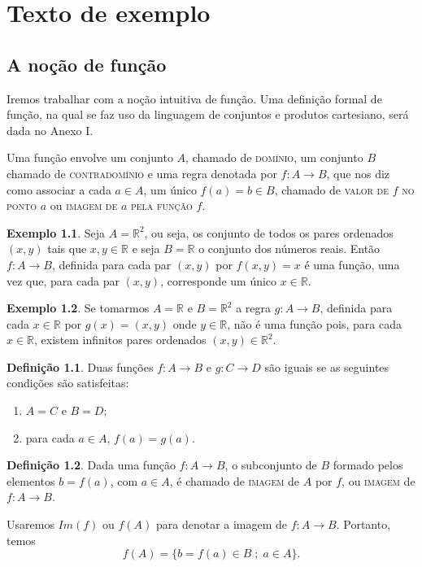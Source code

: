 \documentclass[a4paper,12pt]{monografia}
\theoremstyle{plain}
\theoremstyle{definition}
\newtheorem{definition}{Defini\c{c}\~ao}[section]
\newtheorem{example}{Exemplo}[section]
\theoremstyle{remark}
\newcommand{\R}{\mathbb{R}}
\begin{document}
\chapter{Texto de exemplo}
\section{A no\c{c}\~ao de fun\c{c}\~ao}
\indent\indent Iremos trabalhar com a no\c{c}\~ao intuitiva de fun\c{c}\~ao.
Uma defini\c{c}\~ao formal de fun\c{c}\~ao, na qual se faz uso da linguagem de
conjuntos e produtos cartesiano, ser\'a dada no Anexo I.

Uma fun\c{c}\~ao envolve um conjunto $A$, chamado de \textsc{dom\'inio},
um conjunto $B$ chamado de \textsc{contradom\'inio} e uma regra
denotada por $f:A \rightarrow B$, que nos diz como associar a cada
$a \in A$, um \'unico $f(a)=b \in B$, chamado de \textsc{valor de}
$f$ \textsc{no ponto} $a$ ou \textsc{imagem de} $a$ \textsc{pela
fun\c{c}\~ao} $f$.
\begin{example}\label{R2emR}
Seja $A=\R^2$, ou seja, os conjunto de todos os pares ordenados
$(x,y)$ tais que $x,y \in \R$ e seja $B=\R$ o conjunto dos n\'umeros
reais. Ent\~ao $f:A \rightarrow B$, definida para cada par $(x,y)$
por $f(x,y)=x$ \'e uma fun\c{c}\~ao, uma vez que, para cada par $(x,y)$,
corresponde um \'unico $x \in \R$.
\end{example}
\begin{example}
Se tomarmos $A=\R$ e $B=\R^2$ a regra $g:A \rightarrow B$,
definida para cada $x \in \R$ por $g(x)=(x,y)$ onde $y \in \R$,
n\~ao \'e uma fun\c{c}\~ao pois, para cada $x \in \R$, existem infinitos
pares ordenados $(x,y) \in \R^2$.
\end{example}

\begin{definition}
Duas fun\c{c}\~oes $f:A \rightarrow B$ e $g:C \rightarrow D$ s\~ao iguais
se as seguintes condi\c{c}\~oes s\~ao satisfeitas:
\begin{enumerate}
    \item $A=C$ e $B=D$;
    \item para cada $a \in A$, $f(a)=g(a)$.
\end{enumerate}
\end{definition}
\begin{definition}
Dada uma fun\c{c}\~ao $f:A \rightarrow B$, o subconjunto de $B$ formado
pelos elementos $b=f(a)$, com $a \in A$, \'e chamado de
\textsc{imagem} de $A$ por $f$, ou \textsc{imagem} de $f:A
\rightarrow B$.
\end{definition}
Usaremos $Im(f)$ ou $f(A)$ para denotar a imagem de $f:A
\rightarrow B$. Portanto, temos
$$
f(A)=\{b=f(a)\in B\;;\; a \in A\}.
$$
\end{document}
